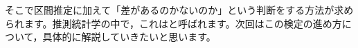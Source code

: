 \documentclass{ltjsbook}
\begin{document}
そこで区間推定に加えて「差があるのかないのか」という判断をする方法が求められます。推測統計学の中で，これはと呼ばれます。次回はこの検定の進め方について，具体的に解説していきたいと思います。


\end{document}

